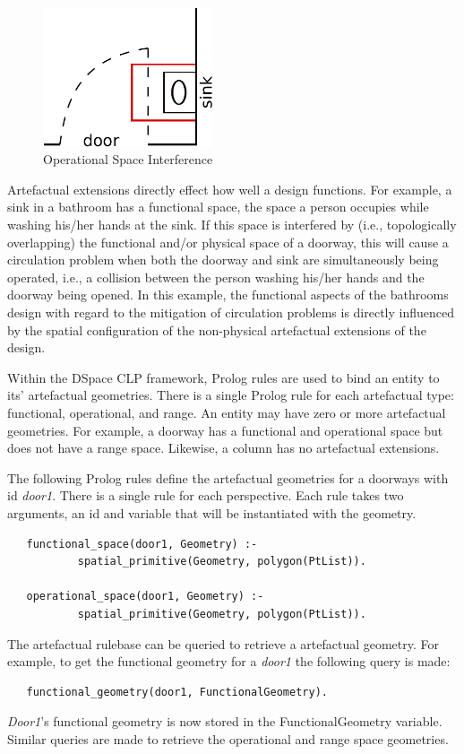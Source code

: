 \documentclass[12pt]{ucthesis}
\begin{document}
\begin{figure}[H]
\centering
\includegraphics[width=50mm]{door-sink}
\caption{Operational Space Interference}
\label{door-sink}
\end{figure}

Artefactual extensions directly effect how well a design functions. For example, a sink in a bathroom has a functional space, the space a person occupies while washing his/her hands at the sink. If this space is interfered by (i.e., topologically overlapping) the functional and/or physical space of a doorway, this will cause a circulation problem when both the doorway and sink are simultaneously being operated, i.e., a collision between the person washing his/her hands and the doorway being opened. In this example, the functional aspects of the bathrooms design with regard to the mitigation of circulation problems is directly influenced by the spatial configuration of the non-physical artefactual extensions of the design. 

Within the DSpace CLP framework, Prolog rules are used to bind an entity to its' artefactual geometries. There is a single Prolog rule for each artefactual type: functional, operational, and range. An entity may have zero or more artefactual geometries. For example, a doorway has a functional and operational space but does not have a range space. Likewise, a column has no artefactual extensions. 

The following Prolog rules define the artefactual geometries for a doorways with id \emph{door1}. There is a single rule for each perspective. Each rule takes two arguments, an id and variable that will be instantiated with the geometry. 
\begin{verbatim}      
   functional_space(door1, Geometry) :-
           spatial_primitive(Geometry, polygon(PtList)).
           
   operational_space(door1, Geometry) :-
           spatial_primitive(Geometry, polygon(PtList)).
\end{verbatim}

The artefactual rulebase can be queried to retrieve a artefactual geometry. For example, to get the functional geometry for a \emph{door1} the following query is made:
\begin{verbatim}
   functional_geometry(door1, FunctionalGeometry).
\end{verbatim}
\emph{Door1}'s functional geometry is now stored in the FunctionalGeometry variable. Similar queries are made to retrieve the operational and range space geometries.
\end{document}
